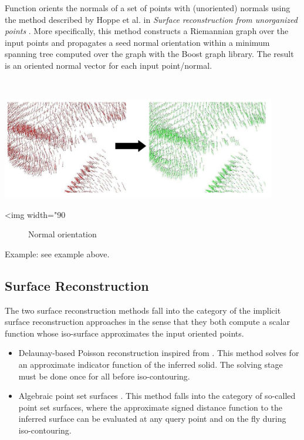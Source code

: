 Function  orients the normals of a set of points with (unoriented) normals using the method described by Hoppe et al. in {\em Surface reconstruction from unorganized points} \cite{cgal:hddms-srup-92}. More specifically, this method constructs a Riemannian graph over the input points and propagates a seed normal orientation within a minimum spanning tree computed over the graph with the Boost graph library. The result is an oriented normal vector for each input point/normal.

  \\

\begin{center}
    \label{Surface_reconstruction_3-fig-mst_normal_orientation}
    \begin{ccTexOnly}
        \includegraphics[width=0.9\textwidth]{Surface_reconstruction_3/mst_normal_orientation} %
    \end{ccTexOnly}
    \begin{ccHtmlOnly}
        <img width="90%
    \end{ccHtmlOnly}
    \begin{figure}[h]
        \caption{Normal orientation}
    \end{figure}
\end{center}

Example: see  example above.

\subsection{Surface Reconstruction}

The two surface reconstruction methods fall into the category of the implicit surface reconstruction approaches in the sense that they both compute a scalar function whose iso-surface approximates the input oriented points.
\begin{itemize}
\item Delaunay-based Poisson reconstruction inspired
      from \cite{Kazhdan06}. This method solves for
      an approximate indicator function of the inferred
      solid. The solving stage must be done once for all 
      before iso-contouring. %
\item Algebraic point set surfaces \cite{Guennebaud07}.
      This method falls into the category of so-called
      point set surfaces, where the approximate
      signed distance function to the inferred surface
      can be evaluated at any query point and on the fly
      during iso-contouring.
\end{itemize}

